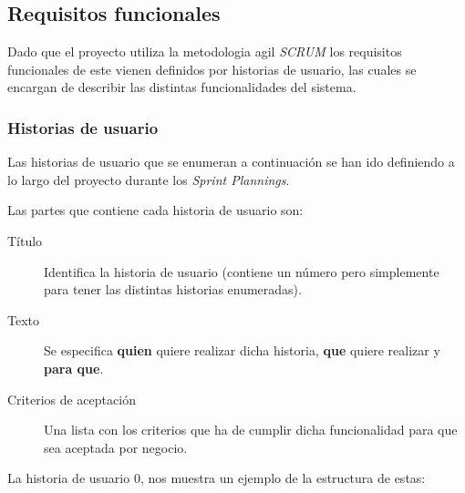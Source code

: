 \subsection{Requisitos funcionales}
Dado que el proyecto utiliza la metodologia agil \textit{SCRUM} los requisitos funcionales de este vienen definidos por historias de usuario, las cuales se encargan de describir las distintas funcionalidades del sistema.
\subsubsection{Historias de usuario}

Las historias de usuario que se enumeran a continuación se han ido definiendo a lo largo del proyecto durante los \textit{Sprint Plannings}.

Las partes que contiene cada historia de usuario son:
\begin{description}
\item[Título] Identifica la historia de usuario (contiene un número pero simplemente para tener las distintas historias enumeradas).
\item[Texto] Se especifica \textbf{quien} quiere realizar dicha historia, \textbf{que} quiere realizar y \textbf{para que}.
\item[Criterios de aceptación] Una lista con los criterios que ha de cumplir dicha funcionalidad para que sea aceptada por negocio.
\end{description}

La historia de usuario 0, nos muestra un ejemplo de la estructura de estas:





